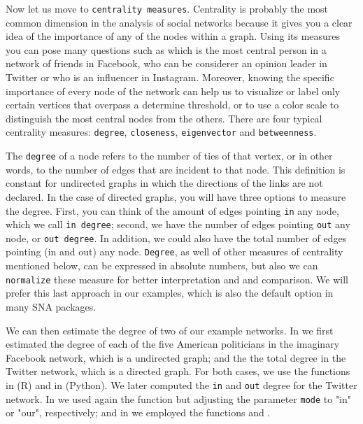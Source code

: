 Now let us move to \texttt{centrality measures}. Centrality is probably the most common dimension in the analysis of social networks because it gives you a clear idea of the importance of any of the nodes within a graph. Using its measures you can pose many questions such as which is the most central person in a network of friends in Facebook, who can be considerer an opinion leader in Twitter or who is an influencer in Instagram. Moreover, knowing the specific importance of every node of the network can help us to visualize or label only certain vertices that overpass a determine threshold, or to use a color scale to distinguish the most central nodes from the others. There are four typical centrality measures: \texttt{degree}, \texttt{closeness}, \texttt{eigenvector} and \texttt{betweenness}.

The \texttt{degree} of a node refers to the number of ties of that vertex, or in other words, to the number of edges that are incident to that node. This definition is constant for undirected graphs in which the directions of the links are not declared. In the case of directed graphs, you will have three options to measure the degree. First, you can think of the amount of edges pointing \texttt{in} any node, which we call \texttt{in degree}; second, we have the number of edges pointing \texttt{out} any node, or \texttt{out degree}. In addition, we could also have the total number of edges pointing (in and out) any node. \texttt{Degree}, as well of other measures of centrality mentioned below, can be expressed in absolute numbers, but also we can \texttt{normalize} these measure for better interpretation and and comparison. We will prefer this last approach in our examples, which is also the default option in many SNA packages.

We can then estimate the degree of two of our example networks. In  we first estimated the degree of each of the five American politicians in the imaginary Facebook network, which is a undirected graph; and the the total degree in the Twitter network, which is a directed graph. For both cases, we use the functions  in  (R) and  in  (Python). We later computed the \texttt{in} and \texttt{out} degree for the Twitter network. In  we used again the function  but adjusting the parameter \texttt{mode} to "in" or "our", respectively; and in  we employed the functions  and .

